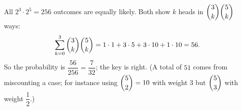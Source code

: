All $2^3\cdot2^5=256$ outcomes are equally likely. Both show $k$ heads in $\dbinom3k\dbinom5k$ ways:
\[
\sum_{k=0}^{3}\dbinom3k\dbinom5k=1\cdot1+3\cdot5+3\cdot10+1\cdot10=56 .
\]
So the probability is $\dfrac{56}{256}=\boxed{\dfrac{7}{32}}$; the key is right. (A total of $51$ comes from miscounting a case; for instance using $\dbinom52=10$ with weight $3$ but $\dbinom53$ with weight $\dfrac{1}{2}$.)
